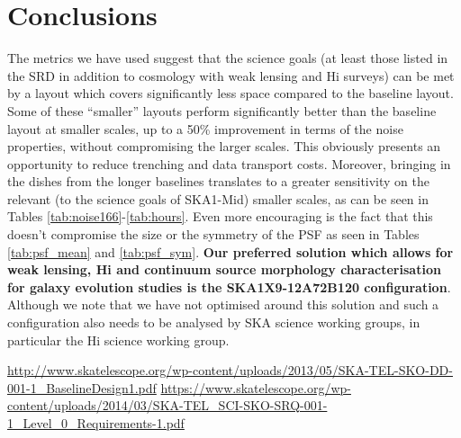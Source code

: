 \documentclass[sfheadings,a4paper,times,10pt,floats,floatfix]{article}
\begin{document}
\section{Conclusions}\label{sec:conclusion}
\vspace{-.1cm}
The metrics we have used suggest that the science goals (at least
those listed in the SRD in addition to cosmology with weak lensing and
H{\sc i} surveys) can be met by a layout which
covers significantly less space compared to the baseline layout. Some
of these ``smaller'' layouts perform significantly better than the
baseline layout at smaller scales, up to a 50\% improvement in terms of the noise properties, without compromising the larger
scales. This obviously presents an opportunity to reduce trenching and data transport costs. Moreover, bringing in the dishes
from the longer baselines translates to a greater sensitivity on the relevant (to the science goals of SKA1-Mid) smaller scales,
as can be seen
in Tables \ref{tab:noise166}-\ref{tab:hours}. Even more encouraging is the fact that this doesn't compromise the size or the
symmetry of the PSF as seen in Tables \ref{tab:psf_mean} and
\ref{tab:psf_sym}. {\bf Our preferred solution which allows for weak
  lensing, H{\sc i} and continuum source morphology characterisation for galaxy
  evolution studies is the SKA1X9-12A72B120 configuration}. Although
we note that we have not optimised around this solution and such a
configuration also needs to be analysed by SKA science working groups, in particular
the H{\sc i} science working group.
\begin{thebibliography}{99}
  \url{http://www.skatelescope.org/wp-content/uploads/2013/05/SKA-TEL-SKO-DD-001-1_BaselineDesign1.pdf}
  \url{https://www.skatelescope.org/wp-content/uploads/2014/03/SKA-TEL_SCI-SKO-SRQ-001-1_Level_0_Requirements-1.pdf}
\end{thebibliography}
\vspace{-.2cm}

\vspace{-.3cm}

\vspace{-.3cm}

\vspace{-.3cm}

\vspace{-.3cm}

\vspace{-.3cm}

\end{document}
